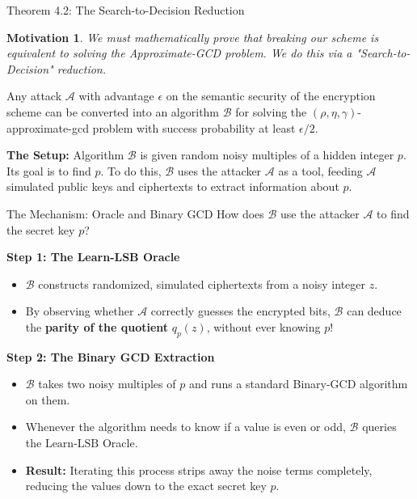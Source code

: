 \documentclass[10pt, aspectratio=169]{beamer}
\newtheorem{motivation}{Motivation}
\begin{document}
\begin{frame}{Theorem 4.2: The Search-to-Decision Reduction}
    \begin{motivation}
    We must mathematically prove that breaking our scheme is equivalent to solving the Approximate-GCD problem. We do this via a "Search-to-Decision" reduction.
    \end{motivation}
    \pause
    
    \vspace{0.3cm}
    \begin{theorem}[4.2]
    Any attack $\mathcal{A}$ with advantage $\epsilon$ on the semantic security of the encryption scheme can be converted into an algorithm $\mathcal{B}$ for solving the $(\rho, \eta, \gamma)$-approximate-gcd problem with success probability at least $\epsilon/2$.
    \end{theorem}
    \pause
    
    \vspace{0.3cm}
    \textbf{The Setup:} 
    Algorithm $\mathcal{B}$ is given random noisy multiples of a hidden integer $p$. Its goal is to find $p$. To do this, $\mathcal{B}$ uses the attacker $\mathcal{A}$ as a tool, feeding $\mathcal{A}$ simulated public keys and ciphertexts to extract information about $p$.
\end{frame}

\begin{frame}{The Mechanism: Oracle and Binary GCD}
    How does $\mathcal{B}$ use the attacker $\mathcal{A}$ to find the secret key $p$?
    \pause

    \vspace{0.3cm}
    \textbf{Step 1: The Learn-LSB Oracle}
    \begin{itemize}
        \item $\mathcal{B}$ constructs randomized, simulated ciphertexts from a noisy integer $z$.
        \item By observing whether $\mathcal{A}$ correctly guesses the encrypted bits, $\mathcal{B}$ can deduce the \textbf{parity of the quotient} $q_p(z)$, without ever knowing $p$!
    \end{itemize}
    \pause

    \vspace{0.3cm}
    \textbf{Step 2: The Binary GCD Extraction}
    \begin{itemize}
        \item $\mathcal{B}$ takes two noisy multiples of $p$ and runs a standard Binary-GCD algorithm on them.
        \item Whenever the algorithm needs to know if a value is even or odd, $\mathcal{B}$ queries the $\text{Learn-LSB}$ Oracle.
        \item \textbf{Result:} Iterating this process strips away the noise terms completely, reducing the values down to the exact secret key $p$.
    \end{itemize}
\end{frame}
\end{document}
